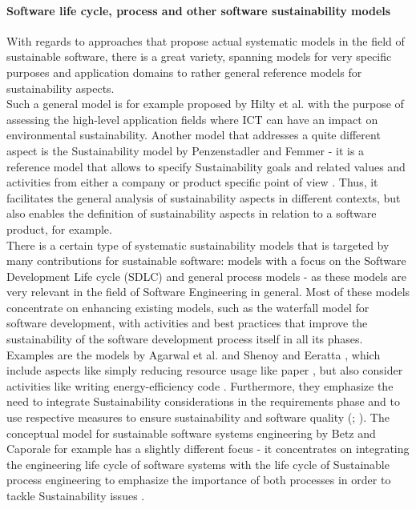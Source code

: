 \documentclass[oribibl]{llncs}
\begin{document}
\paragraph{Software life cycle, process and other software sustainability models}
With regards to approaches that propose actual systematic%
models in the field of sustainable software, there is a great variety, spanning models for very specific purposes and application domains %
to rather general reference models for sustainability aspects.\\
Such a general model is for example proposed by Hilty et al. \cite{hilty_relevance_2006} with the purpose of assessing the high-level application fields where ICT can have an impact on environmental sustainability. Another model that addresses a quite different aspect is the Sustainability model by Penzenstadler and Femmer \cite{penzenstadler_generic_2013} - it is a reference model that allows to specify Sustainability goals and related values and activities from either a company or product specific point of view \cite{penzenstadler_generic_2013}. Thus, it facilitates the general analysis of sustainability aspects in different contexts, but also enables the definition of sustainability aspects in relation to a software product, for example.\\
There is a certain type of systematic sustainability models that is targeted by many contributions for sustainable software: models with a focus on the Software Development Life cycle (SDLC) %
and general process models - as these models are very relevant in the field of Software Engineering in general. Most of these models concentrate on enhancing existing models, such as the waterfall model %
for software development, with activities and best practices that improve the sustainability of the software development process itself in all its phases. Examples are the models by Agarwal et al. \cite{agarwal_sustainable_2012} and Shenoy and Eeratta \cite{shenoy_green_2011}, which include aspects like simply reducing resource usage like paper \cite{shenoy_green_2011}, but also consider activities like writing energy-efficiency code \cite{agarwal_sustainable_2012}. Furthermore, they emphasize the need to integrate Sustainability considerations in the requirements phase and to use respective measures to ensure sustainability and software quality (\cite{agarwal_sustainable_2012}; \cite{shenoy_green_2011}). The conceptual model for sustainable software systems engineering by Betz and Caporale \cite{betz_sustainable_2014} for example has a slightly different focus - it concentrates on integrating the engineering life cycle of software systems with the life cycle of Sustainable process engineering to emphasize the importance of both processes in order to tackle Sustainability issues \cite{betz_sustainable_2014}.
\end{document}
